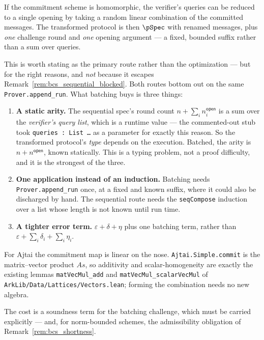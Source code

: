 \begin{remark}
    \label{rem:bcs_batched}
    If the commitment scheme is homomorphic, the verifier's queries can be reduced to a single
    opening by taking a random linear combination of the committed messages. The transformed
    protocol is then $\pSpec$ with renamed messages, plus \emph{one} challenge round and
    \emph{one} opening argument --- a fixed, bounded suffix rather than a sum over queries.

    This is worth stating as the primary route rather than the optimization --- but for the
    right reasons, and \emph{not} because it escapes
    Remark~\ref{rem:bcs_sequential_blocked}. Both routes bottom out on the same
    \texttt{Prover.append\_run}. What batching buys is three things:

    \begin{enumerate}
        \item \textbf{A static arity.} The sequential spec's round count
            $n + \sum_i n^{\mathsf{open}}_i$ is a sum over the \emph{verifier's query list},
            which is a runtime value --- the commented-out stub took
            \texttt{queries : List \ldots} as a parameter for exactly this reason. So the
            transformed protocol's \emph{type} depends on the execution. Batched, the arity is
            $n + n^{\mathsf{open}}$, known statically. This is a typing problem, not a proof
            difficulty, and it is the strongest of the three.
        \item \textbf{One application instead of an induction.} Batching needs
            \texttt{Prover.append\_run} once, at a fixed and known suffix, where it could also be
            discharged by hand. The sequential route needs the \texttt{seqCompose} induction over
            a list whose length is not known until run time.
        \item \textbf{A tighter error term.} $\varepsilon + \delta + \eta$ plus one batching
            term, rather than $\varepsilon + \sum_i \delta_i + \sum_i \eta_i$.
    \end{enumerate}

    For Ajtai the commitment map is linear on the nose. \texttt{Ajtai.Simple.commit} is the
    matrix--vector product $As$, so additivity and scalar-homogeneity are exactly the existing
    lemmas \texttt{matVecMul\_add} and \texttt{matVecMul\_scalarVecMul} of
    \texttt{ArkLib/Data/Lattices/Vectors.lean}; forming the combination needs no new algebra.

    The cost is a soundness term for the batching challenge, which must be carried explicitly ---
    and, for norm-bounded schemes, the admissibility obligation of
    Remark~\ref{rem:bcs_shortness}.
\end{remark}

